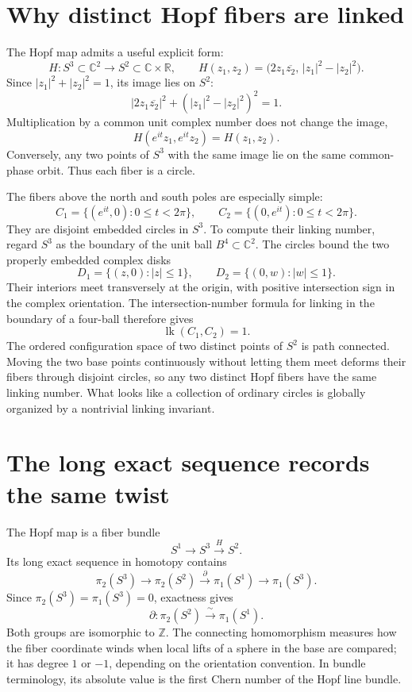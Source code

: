 \section{Why distinct Hopf fibers are linked}

The Hopf map admits a useful explicit form:
\[
 H:S^3\subset\mathbb C^2\longrightarrow S^2\subset\mathbb C\times\mathbb R,
 \qquad
 H(z_1,z_2)=
 \bigl(2z_1\overline{z_2},\,|z_1|^2-|z_2|^2\bigr).
\]
Since \(|z_1|^2+|z_2|^2=1\), its image lies on \(S^2\):
\[
 |2z_1\overline{z_2}|^2+
 (|z_1|^2-|z_2|^2)^2=1.
\]
Multiplication by a common unit complex number does not change the image,
\[
 H(e^{it}z_1,e^{it}z_2)=H(z_1,z_2).
\]
Conversely, any two points of \(S^3\) with the same image lie on the same common-phase orbit. Thus each fiber is a circle.

The fibers above the north and south poles are especially simple:
\[
 C_1=\{(e^{it},0):0\le t<2\pi\},\qquad
 C_2=\{(0,e^{it}):0\le t<2\pi\}.
\]
They are disjoint embedded circles in \(S^3\). To compute their linking number, regard \(S^3\) as the boundary of the unit ball \(B^4\subset\mathbb C^2\). The circles bound the two properly embedded complex disks
\[
 D_1=\{(z,0):|z|\le1\},\qquad
 D_2=\{(0,w):|w|\le1\}.
\]
Their interiors meet transversely at the origin, with positive intersection sign in the complex orientation. The intersection-number formula for linking in the boundary of a four-ball therefore gives
\[
 \boxed{\operatorname{lk}(C_1,C_2)=1}.
\]
The ordered configuration space of two distinct points of \(S^2\) is path connected. Moving the two base points continuously without letting them meet deforms their fibers through disjoint circles, so any two distinct Hopf fibers have the same linking number. What looks like a collection of ordinary circles is globally organized by a nontrivial linking invariant.

\section{The long exact sequence records the same twist}

The Hopf map is a fiber bundle
\[
 S^1\longrightarrow S^3\xrightarrow{H}S^2.
\]
Its long exact sequence in homotopy contains
\[
 \pi_2(S^3)\longrightarrow
 \pi_2(S^2)\xrightarrow{\ \partial\ }\pi_1(S^1)
 \longrightarrow\pi_1(S^3).
\]
Since \(\pi_2(S^3)=\pi_1(S^3)=0\), exactness gives
\[
 \boxed{\partial:\pi_2(S^2)\xrightarrow{\ \sim\ }\pi_1(S^1)}.
\]
Both groups are isomorphic to \(\mathbb Z\). The connecting homomorphism measures how the fiber coordinate winds when local lifts of a sphere in the base are compared; it has degree \(1\) or \(-1\), depending on the orientation convention. In bundle terminology, its absolute value is the first Chern number of the Hopf line bundle.

